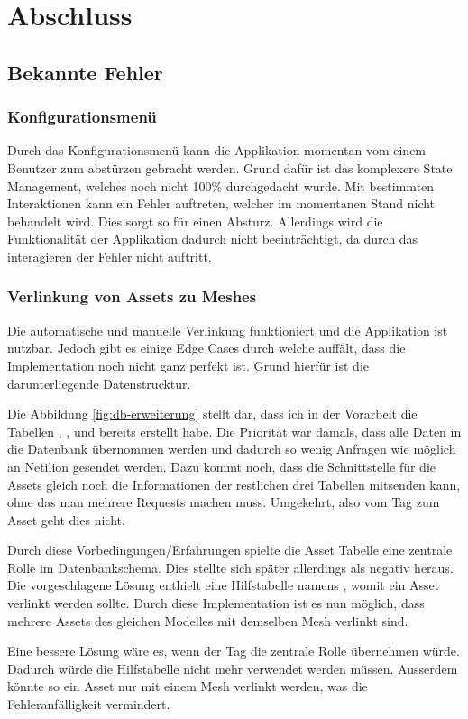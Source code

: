 \chapter{Abschluss} \label{abschluss}
\section{Bekannte Fehler}
\subsection{Konfigurationsmenü}
Durch das Konfigurationsmenü kann die Applikation momentan vom einem Benutzer zum abstürzen gebracht werden. Grund dafür ist das komplexere State Management, welches noch nicht 100\% durchgedacht wurde. Mit bestimmten Interaktionen kann ein Fehler auftreten, welcher im momentanen Stand nicht behandelt wird. Dies sorgt so für einen Absturz.
Allerdings wird die Funktionalität der Applikation dadurch nicht beeinträchtigt, da durch das  interagieren der Fehler nicht auftritt.
\subsection{Verlinkung von Assets zu Meshes}
Die automatische und manuelle Verlinkung funktioniert und die Applikation ist nutzbar. Jedoch gibt es einige Edge Cases durch welche auffält, dass die Implementation noch nicht ganz perfekt ist. Grund hierfür ist die darunterliegende Datenstrucktur.

Die Abbildung \ref{fig:db-erweiterung} stellt dar, dass ich in der Vorarbeit die Tabellen , ,  und  bereits erstellt habe. Die Priorität war damals, dass alle Daten in die Datenbank übernommen werden und dadurch so wenig Anfragen wie möglich an Netilion gesendet werden. Dazu kommt noch, dass die Schnittstelle für die Assets gleich noch die Informationen der restlichen drei Tabellen mitsenden kann, ohne das man mehrere Requests machen muss. Umgekehrt, also vom Tag zum Asset geht dies nicht.

Durch diese Vorbedingungen/Erfahrungen spielte die Asset Tabelle eine zentrale Rolle im Datenbankschema. Dies stellte sich später allerdings als negativ heraus. Die vorgeschlagene Lösung enthielt eine Hilfstabelle namens , womit ein Asset verlinkt werden sollte. Durch diese Implementation ist es nun möglich, dass mehrere Assets des gleichen Modelles mit demselben Mesh verlinkt sind.

Eine bessere Lösung wäre es, wenn der Tag die zentrale Rolle übernehmen würde. Dadurch würde die Hilfstabelle  nicht mehr verwendet werden müssen. Ausserdem könnte so ein Asset nur mit einem Mesh verlinkt werden, was die Fehleranfälligkeit vermindert.

